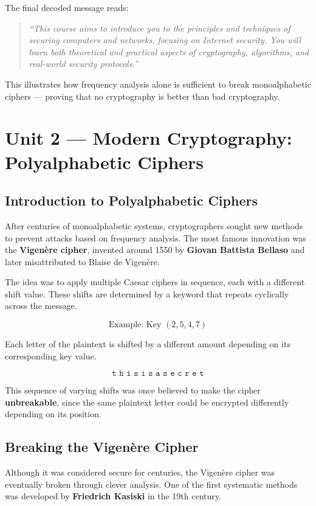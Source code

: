 The final decoded message reads:

\begin{quote}
\textit{“This course aims to introduce you to the principles and techniques of securing computers and networks, focusing on Internet security. You will learn both theoretical and practical aspects of cryptography, algorithms, and real-world security protocols.”}
\end{quote}

This illustrates how frequency analysis alone is sufficient to break monoalphabetic ciphers — proving that no cryptography is better than bad cryptography.

\section{Unit 2 — Modern Cryptography: Polyalphabetic Ciphers}

\subsection{Introduction to Polyalphabetic Ciphers}

After centuries of monoalphabetic systems, cryptographers sought new methods to prevent attacks based on frequency analysis.  
The most famous innovation was the \textbf{Vigenère cipher}, invented around 1550 by \textbf{Giovan Battista Bellaso} and later misattributed to Blaise de Vigenère.

The idea was to apply multiple Caesar ciphers in sequence, each with a different shift value.  
These shifts are determined by a keyword that repeats cyclically across the message.

\[
\text{Example: Key } (2,5,4,7)
\]

Each letter of the plaintext is shifted by a different amount depending on its corresponding key value.

\[
\texttt{t h i s i s a s e c r e t}
\]

This sequence of varying shifts was once believed to make the cipher \textbf{unbreakable}, since the same plaintext letter could be encrypted differently depending on its position.

\subsection{Breaking the Vigenère Cipher}

Although it was considered secure for centuries, the Vigenère cipher was eventually broken through clever analysis.  
One of the first systematic methods was developed by \textbf{Friedrich Kasiski} in the 19th century.


